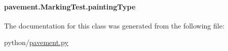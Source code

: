 \hypertarget{classpavement_1_1MarkingTest_a812f9cf99f25212085a32db7b6565d74}{
\paragraph[{painting\-Type}]{\setlength{\rightskip}{0pt plus 5cm}pavement.\-Marking\-Test.\-painting\-Type}}\label{classpavement_1_1MarkingTest_a812f9cf99f25212085a32db7b6565d74}


The documentation for this class was generated from the following file\-:\begin{DoxyCompactItemize}
\item 
python/\hyperlink{pavement_8py}{pavement.\-py}\end{DoxyCompactItemize}
